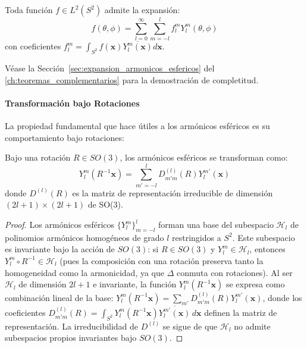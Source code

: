 \begin{theorem}
Toda función $f \in L^2(S^2)$ admite la expansión:
\begin{equation}
f(\theta, \phi) = \sum_{l=0}^{\infty} \sum_{m=-l}^{l} f_l^m Y_l^m(\theta, \phi)
\end{equation}
con coeficientes $f_l^m = \int_{S^2} f(\mathbf{x}) \overline{Y_l^m(\mathbf{x})} d\mathbf{x}$.

Véase la Sección~\ref{sec:expansion_armonicos_esfericos} del \autoref{ch:teoremas_complementarios} para la demostración de completitud.
\end{theorem}

\paragraph{Transformación bajo Rotaciones}

La propiedad fundamental que hace útiles a los armónicos esféricos es su comportamiento bajo rotaciones:

\begin{theorem}
Bajo una rotación $R \in SO(3)$, los armónicos esféricos se transforman como:
\begin{equation}
Y_l^m(R^{-1}\mathbf{x}) = \sum_{m'=-l}^{l} D_{m'm}^{(l)}(R) Y_l^{m'}(\mathbf{x})
\end{equation}
donde $D^{(l)}(R)$ es la matriz de representación irreducible de dimensión $(2l+1) \times (2l+1)$ de SO(3).
\end{theorem}

\begin{proof}
Los armónicos esféricos $\{Y_l^m\}_{m=-l}^{l}$ forman una base del subespacio $\mathcal{H}_l$ de polinomios armónicos homogéneos de grado $l$ restringidos a $S^2$. Este subespacio es invariante bajo la acción de $SO(3)$: si $R \in SO(3)$ y $Y_l^m \in \mathcal{H}_l$, entonces $Y_l^m \circ R^{-1} \in \mathcal{H}_l$ (pues la composición con una rotación preserva tanto la homogeneidad como la armonicidad, ya que $\Delta$ conmuta con rotaciones). Al ser $\mathcal{H}_l$ de dimensión $2l+1$ e invariante, la función $Y_l^m(R^{-1}\mathbf{x})$ se expresa como combinación lineal de la base: $Y_l^m(R^{-1}\mathbf{x}) = \sum_{m'} D_{m'm}^{(l)}(R) Y_l^{m'}(\mathbf{x})$, donde los coeficientes $D_{m'm}^{(l)}(R) = \int_{S^2} Y_l^m(R^{-1}\mathbf{x}) \overline{Y_l^{m'}(\mathbf{x})} \, d\mathbf{x}$ definen la matriz de representación. La irreducibilidad de $D^{(l)}$ se sigue de que $\mathcal{H}_l$ no admite subespacios propios invariantes bajo $SO(3)$.
\end{proof}

